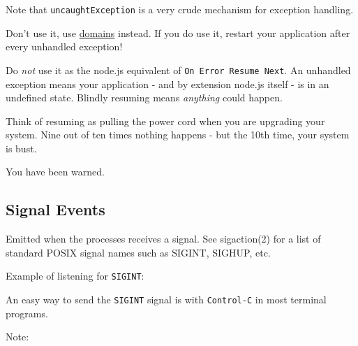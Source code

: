 Note that \texttt{uncaughtException} is a very crude mechanism for
exception handling.

Don't use it, use \href{domain.html}{domains} instead. If you do use it,
restart your application after every unhandled exception!

Do \emph{not} use it as the node.js equivalent of
\texttt{On Error Resume Next}. An unhandled exception means your
application - and by extension node.js itself - is in an undefined
state. Blindly resuming means \emph{anything} could happen.

Think of resuming as pulling the power cord when you are upgrading your
system. Nine out of ten times nothing happens - but the 10th time, your
system is bust.

You have been warned.

\subsection{Signal Events}\label{signal-events}

Emitted when the processes receives a signal. See sigaction(2) for a
list of standard POSIX signal names such as SIGINT, SIGHUP, etc.

Example of listening for \texttt{SIGINT}:

\begin{Shaded}
\begin{Highlighting}[]
\NormalTok{();}

\NormalTok{(}\NormalTok{, }\NormalTok{() \{}
  \NormalTok{(}\NormalTok{);}
\NormalTok{\});}
\end{Highlighting}
\end{Shaded}

An easy way to send the \texttt{SIGINT} signal is with
\texttt{Control-C} in most terminal programs.

Note:

